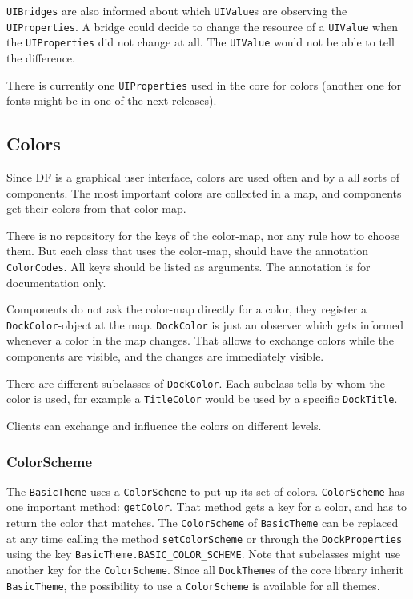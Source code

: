 \documentclass[a4paper,10pt]{article}
\newcommand{\src}[1]{\lstinline[basicstyle=\normalsize\ttfamily,keywordstyle=\normalsize\ttfamily,identifierstyle=\normalsize\ttfamily]|#1|}
\begin{document}
\src{UIBridges} are also informed about which \src{UIValue}s are observing the \\\src{UIProperties}. A bridge could decide to change the resource of a \src{UIValue} when the \src{UIProperties} did not change at all. The \src{UIValue} would not be able to tell the difference.

There is currently one \src{UIProperties} used in the core for colors (another one for fonts might be in one of the next releases).

\subsection{Colors}
Since DF is a graphical user interface, colors are used often and by a all sorts of components. The most important colors are collected in a map, and components get their colors from that color-map.

There is no repository for the keys of the color-map, nor any rule how to choose them. But each class that uses the color-map, should have the annotation \src{ColorCodes}. All keys should be listed as arguments. The annotation is for documentation only.

Components do not ask the color-map directly for a color, they register a \src{DockColor}-object at the map. \src{DockColor} is just an observer which gets informed whenever a color in the map changes. That allows to exchange colors while the components are visible, and the changes are immediately visible.

There are different subclasses of \src{DockColor}. Each subclass tells by whom the color is used, for example a \src{TitleColor} would be used by a specific \src{DockTitle}.

Clients can exchange and influence the colors on different levels.

\subsubsection{ColorScheme}
The \src{BasicTheme} uses a \src{ColorScheme} to put up its set of colors. \src{ColorScheme} has one important method: \src{getColor}. That method gets a key for a color, and has to return the color that matches. The \src{ColorScheme} of \src{BasicTheme} can be replaced at any time calling the method \src{setColorScheme} or through the \src{DockProperties} using the key \src{BasicTheme.BASIC_COLOR_SCHEME}. Note that subclasses might use another key for the \src{ColorScheme}. Since all \src{DockTheme}s of the core library inherit \src{BasicTheme}, the possibility to use a \src{ColorScheme} is available for all themes.
\end{document}
